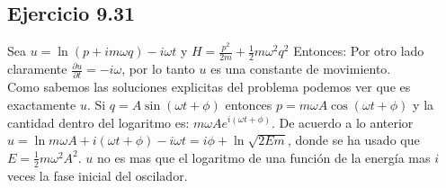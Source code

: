 \subsection*{Ejercicio 9.31}
Sea $u=\ln (p+i m \omega q)-i \omega t$ y $H=\frac{p^2}{2 m}+\frac{1}{2} m
   \omega^2 q^2 $
Entonces:
Por otro lado claramente $\frac{\partial u}{\partial t}=-i \omega$, por lo tanto $u$ es una constante de movimiento.\\
Como sabemos las soluciones explicitas del problema podemos ver que es exactamente $u$. Si $q=A \sin (\omega t+\phi)$ entonces $p=m \omega A \cos( \omega t+\phi)$ y la cantidad dentro del logaritmo es: $m \omega A e^{i (\omega t +\phi)}$. De acuerdo a lo anterior $u=\ln m \omega A+i (\omega t +\phi)-i \omega t=i\phi+\ln \sqrt{2 E m}$, donde se ha usado que $E=\frac{1}{2} m \omega^2 A^2$. $u$ no es mas que el logaritmo de una funci\'on de la energ\'ia mas $i$ veces la fase inicial del oscilador.


